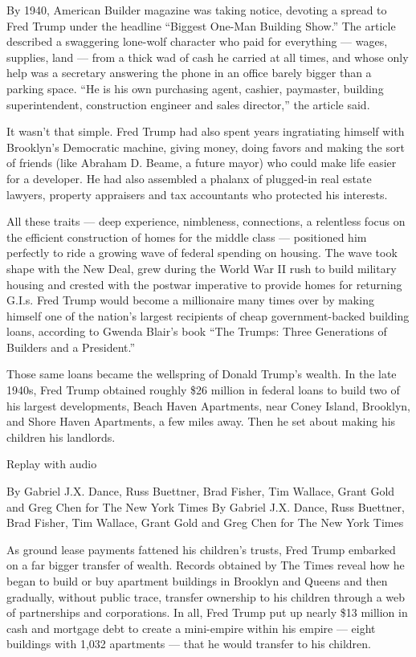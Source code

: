 By 1940, American Builder magazine was taking notice, devoting a spread
to Fred Trump under the headline ``Biggest One-Man Building Show.'' The
article described a swaggering lone-wolf character who paid for
everything --- wages, supplies, land --- from a thick wad of cash he
carried at all times, and whose only help was a secretary answering the
phone in an office barely bigger than a parking space. ``He is his own
purchasing agent, cashier, paymaster, building superintendent,
construction engineer and sales director,'' the article said.

It wasn't that simple. Fred Trump had also spent years ingratiating
himself with Brooklyn's Democratic machine, giving money, doing favors
and making the sort of friends (like Abraham D. Beame, a future mayor)
who could make life easier for a developer. He had also assembled a
phalanx of plugged-in real estate lawyers, property appraisers and tax
accountants who protected his interests.

All these traits --- deep experience, nimbleness, connections, a
relentless focus on the efficient construction of homes for the middle
class --- positioned him perfectly to ride a growing wave of federal
spending on housing. The wave took shape with the New Deal, grew during
the World War II rush to build military housing and crested with the
postwar imperative to provide homes for returning G.I.s. Fred Trump
would become a millionaire many times over by making himself one of the
nation's largest recipients of cheap government-backed building loans,
according to Gwenda Blair's book ``The Trumps: Three Generations of
Builders and a President.''

Those same loans became the wellspring of Donald Trump's wealth. In the
late 1940s, Fred Trump obtained roughly \$26 million in federal loans to
build two of his largest developments, Beach Haven Apartments, near
Coney Island, Brooklyn, and Shore Haven Apartments, a few miles away.
Then he set about making his children his landlords.

Replay with audio

By Gabriel J.X. Dance, Russ Buettner, Brad Fisher, Tim Wallace, Grant
Gold and Greg Chen for The New York Times By Gabriel J.X. Dance, Russ
Buettner, Brad Fisher, Tim Wallace, Grant Gold and Greg Chen for The New
York Times

As ground lease payments fattened his children's trusts, Fred Trump
embarked on a far bigger transfer of wealth. Records obtained by The
Times reveal how he began to build or buy apartment buildings in
Brooklyn and Queens and then gradually, without public trace, transfer
ownership to his children through a web of partnerships and
corporations. In all, Fred Trump put up nearly \$13 million in cash and
mortgage debt to create a mini-empire within his empire --- eight
buildings with 1,032 apartments --- that he would transfer to his
children.

